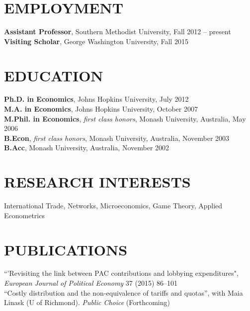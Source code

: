\documentclass[11pt]{res}
\begin{document}
\begin{resume}
\hspace{-0.5in}\makebox[6.1in]{\hrulefill}

\section{EMPLOYMENT} \vspace{1.5mm}
{\bf Assistant Professor}, Southern Methodist University, Fall 2012 -- present\vspace{.5mm}\\
{\bf Visiting Scholar}, George Washington University, Fall 2015


\section{EDUCATION} \vspace{1.5mm}
    {\bf Ph.D. in Economics}, Johns Hopkins University, July 2012 \vspace{.5mm}\\
    {\bf M.A. in Economics}, Johns Hopkins University, October 2007\vspace{1.5mm}\\
    {\bf M.Phil. in Economics}, \emph{first class honors}, Monash University, Australia, May 2006\vspace{1.5mm}\\
    {\bf B.Econ}, \emph{first class honors}, Monash University, Australia, November 2003\vspace{1.5mm}\\
    {\bf B.Acc}, Monash University, Australia, November 2002


\section{RESEARCH INTERESTS}\vspace{1.5mm}
International Trade, Networks, Microeconomics, Game Theory, Applied Econometrics

\section{PUBLICATIONS}\vspace{1.5mm}
{``'Revisiting the link between PAC contributions and lobbying expenditures", \emph{European Journal of Political Economy}} 37 (2015) 86--101 \vspace{1.5mm}\\
{``Costly distribution and the non-equivalence of tariffs and quotas''}, with Maia Linask (U of Richmond). \emph{Public Choice} (Forthcoming) \vspace{1.5mm}\\


\end{resume}
\end{document}
